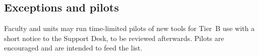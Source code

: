 \subsection{Exceptions and pilots}
Faculty and units may run time-limited pilots of new tools for Tier~B use with a short notice to the Support Desk, to be reviewed afterwards. Pilots are encouraged and are intended to feed the list.

